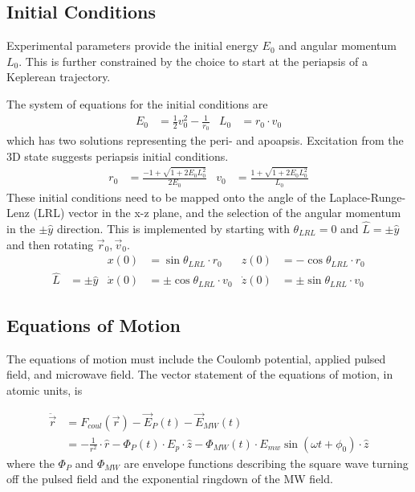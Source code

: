 \documentclass[aps,pra,preprint,groupedaddress]{revtex4-1}
\begin{document}
\subsection{\label{sec:IC} Initial Conditions}

Experimental parameters provide the initial energy $E_0$ and angular momentum $L_0$. This is further constrained by the choice to start at the periapsis of a Keplerean trajectory.

The system of equations for the initial conditions are
\begin{align*}
E_0 & = \frac{1}{2} v_0^2 - \frac{1}{r_0} & L_0 & = r_0 \cdot v_0
\end{align*}
which has two solutions representing the peri- and apoapsis. Excitation from the 3D state suggests periapsis initial conditions.
\begin{align*}
r_0 & = \frac{-1 + \sqrt{1 + 2 E_0 L_0^2}}{2 E_0} & v_0 & = \frac{1 + \sqrt{1 + 2 E_0 L_0^2}}{L_0}
\end{align*}
These initial conditions need to be mapped onto the angle of the Laplace-Runge-Lenz (LRL) vector in the x-z plane, and the selection of the angular momentum in the $\pm \hat{y}$ direction. This is implemented by starting with $\theta_{LRL} = 0$ and $\hat{L} = \pm \hat{y}$ and then rotating $\vec{r}_0, \vec{v}_0$.
\begin{align*}
& & x(0) & = \sin{\theta_{LRL}} \cdot r_0 & z(0) & = -\cos{\theta_{LRL}} \cdot r_0 \\
\hat{L} & = \pm \hat{y} & \dot{x}(0) & = \pm \cos{\theta_{LRL}} \cdot v_0 & \dot{z}(0) & = \pm \sin{\theta_{LRL}} \cdot v_0
\end{align*}

\subsection{\label{sec:EoM} Equations of Motion}

The equations of motion must include the Coulomb potential, applied pulsed field, and microwave field. The vector statement of the equations of motion, in atomic units, is

\begin{align*}
\ddot{\vec{r}} & = F_{coul}(\vec{r}) - \vec{E}_{P}(t) - \vec{E}_{MW}(t) \\
 & = -\frac{1}{r^2} \cdot \hat{r} - \Phi_P(t) \cdot E_{p} \cdot \hat{z} - \Phi_{MW}(t) \cdot E_{mw} \sin{(\omega t + \phi_0)} \cdot \hat{z} 
\end{align*}
where the $\Phi_P$ and $\Phi_{MW}$ are envelope functions describing the square wave turning off the pulsed field and the exponential ringdown of the MW field.
\end{document}
